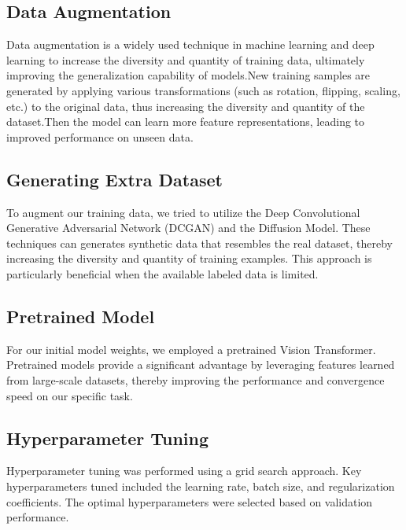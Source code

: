 \subsection{Data Augmentation}
Data augmentation is a widely used technique in machine learning and deep learning to increase the diversity and quantity of training data, ultimately improving the generalization capability of models.New training samples are generated by applying various transformations (such as rotation, flipping, scaling, etc.) to the original data, thus increasing the diversity and quantity of the dataset.Then the model can learn more feature representations, leading to improved performance on unseen data.

\subsection{Generating Extra Dataset}
To augment our training data, we tried to utilize the Deep Convolutional Generative Adversarial Network (DCGAN) and the Diffusion Model. These techniques can generates synthetic data that resembles the real dataset, thereby increasing the diversity and quantity of training examples. This approach is particularly beneficial when the available labeled data is limited.

\subsection{Pretrained Model}
For our initial model weights, we employed a pretrained Vision Transformer. Pretrained models provide a significant advantage by leveraging features learned from large-scale datasets, thereby improving the performance and convergence speed on our specific task.

\subsection{Hyperparameter Tuning}
Hyperparameter tuning was performed using a grid search approach. Key hyperparameters tuned included the learning rate, batch size, and regularization coefficients. The optimal hyperparameters were selected based on validation performance.

